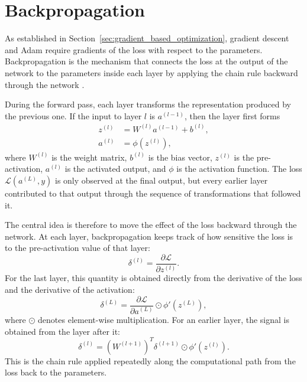 \section{Backpropagation}

As established in Section~\ref{sec:gradient_based_optimization}, gradient descent and Adam require gradients of the loss with respect to the parameters. Backpropagation is the mechanism that connects the loss at the output of the network to the parameters inside each layer by applying the chain rule backward through the network \cite{Rumelhart1986}.

During the forward pass, each layer transforms the representation produced by the previous one. If the input to layer $l$ is $a^{(l-1)}$, then the layer first forms
\begin{align}
    z^{(l)} &= W^{(l)}a^{(l-1)} + b^{(l)},\\
    a^{(l)} &= \phi\!\left(z^{(l)}\right),
\end{align}
where $W^{(l)}$ is the weight matrix, $b^{(l)}$ is the bias vector, $z^{(l)}$ is the pre-activation, $a^{(l)}$ is the activated output, and $\phi$ is the activation function. The loss $\mathcal{L}(a^{(L)},y)$ is only observed at the final output, but every earlier layer contributed to that output through the sequence of transformations that followed it.

The central idea is therefore to move the effect of the loss backward through the network. At each layer, backpropagation keeps track of how sensitive the loss is to the pre-activation value of that layer:
\begin{equation}
    \delta^{(l)} = \frac{\partial \mathcal{L}}{\partial z^{(l)}}.
\end{equation}
For the last layer, this quantity is obtained directly from the derivative of the loss and the derivative of the activation:
\begin{equation}
    \delta^{(L)}
    =
    \frac{\partial \mathcal{L}}{\partial a^{(L)}}
    \odot
    \phi'\!\left(z^{(L)}\right),
\end{equation}
where $\odot$ denotes element-wise multiplication. For an earlier layer, the signal is obtained from the layer after it:
\begin{equation}
    \delta^{(l)}
    =
    \left(W^{(l+1)}\right)^{T}\delta^{(l+1)}
    \odot
    \phi'\!\left(z^{(l)}\right).
\end{equation}
This is the chain rule applied repeatedly along the computational path from the loss back to the parameters.

